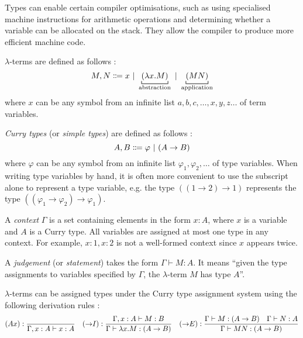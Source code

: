 Types can enable certain compiler optimisations, such as using specialised machine instructions for arithmetic operations and determining whether a variable can be allocated on the stack. They allow the compiler to produce more efficient machine code.
\begin{definition}
    \label{lambda:lambda-terms}
    $\lambda$-terms are defined as follows \cite{church:1941}:
    \[
        M,N \Coloneqq x \alt \underbracket[0.6pt]{(\lambda x. M)}_\text{abstraction} \alt \underbracket[0.6pt]{(MN)}_\text{application}
    \]
    where $x$ can be any symbol from an infinite list $a, b, c, \ldots, x, y, z \ldots$ of term variables.
\end{definition}
\begin{definition}
    \label{lambda:curry-types}
    \textit{Curry types} (or \textit{simple types}) are defined as follows \cite{van-bakel:2022}:
    \[
        A, B \Coloneqq \varphi \ |\  (A \rightarrow B)
    \]
    where $\varphi$ can be any symbol from an infinite list $\varphi_1, \varphi_2, \ldots$ of type variables. When writing type variables by hand, it is often more convenient to use the subscript alone to represent a type variable, e.g. the type $((1 \rightarrow 2) \rightarrow 1)$ represents the type $((\varphi_1 \rightarrow \varphi_2) \rightarrow \varphi_1)$.
\end{definition}
\begin{definition}
    A \textit{context} $\Gamma$ is a set containing elements in the form $x:A$, where $x$ is a variable and $A$ is a Curry type. All variables are assigned at most one type in any context. For example, $x:1, x:2$ is not a well-formed context since $x$ appears twice.
\end{definition}
\begin{definition}
    A \textit{judgement} (or \textit{statement}) takes the form $\Gamma \vdash M: A$. It means ``given the type assignments to variables specified by $\Gamma$, the $\lambda$-term $M$ has type $A$''.
\end{definition}
\begin{definition}
    \label{lambda:type-assignment}
    $\lambda$-terms can be assigned types under the Curry type assignment system using the following derivation rules \cite{van-bakel:2022}:
    {
        \derivationfont
        \[
            (Ax): \frac{}{\Gamma, x:A \vdash x:A} \quad (\mathord{\to} I): \frac{\Gamma, x:A \vdash M:B}{\Gamma \vdash \lambda x. M: (A \to B)} \quad (\mathord{\to} E): \frac{\Gamma \vdash M: (A \to B) \quad \Gamma \vdash N: A}{\Gamma \vdash MN: (A \to B)}
        \]
    }%
\end{definition}

